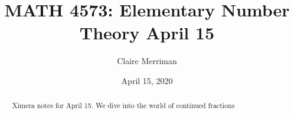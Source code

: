 \documentclass{xourse}
\title{MATH 4573: Elementary Number Theory April 15}
\author{Claire Merriman}
\date{April 15, 2020}
\begin{document}
  
\begin{abstract} %
Ximera notes for April 15. We dive into the world of continued fractions

\end{abstract}  
\maketitle 
 
 
\end{document}
